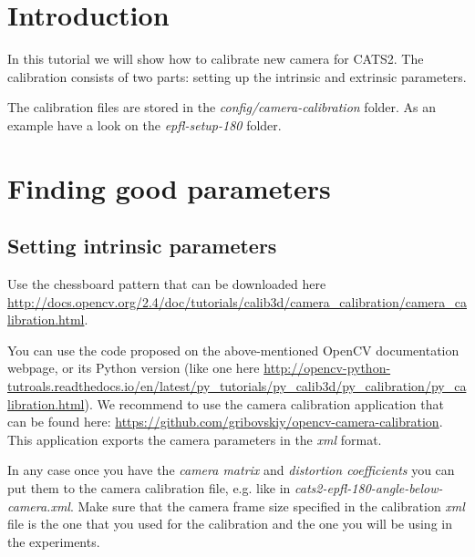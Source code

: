 \documentclass{styles/assisi}
\begin{document}

\lstset{
    language=xml,
    tabsize=3,
    xleftmargin=20pt,
    framexleftmargin=15pt,
    numbers=left,
    numberstyle=\tiny,
    numbersep=5pt,
    breaklines=true,
    showstringspaces=false,
    basicstyle=\footnotesize}

\chapter{Introduction}\label{chap:intro}
In this tutorial we will show how to calibrate new camera for CATS2. The calibration consists of two parts: setting up the intrinsic and extrinsic parameters. 

The calibration files are stored in the {\it config/camera-calibration} folder. As an example have a look on the {\it epfl-setup-180} folder.

\chapter{Finding good parameters}\label{chap:calibration}
\section{Setting intrinsic parameters}
Use the chessboard pattern that can be downloaded here \url{http://docs.opencv.org/2.4/doc/tutorials/calib3d/camera_calibration/camera_calibration.html}. 

You can use the code proposed on the above-mentioned OpenCV documentation webpage, or its Python version (like one here \url{http://opencv-python-tutroals.readthedocs.io/en/latest/py_tutorials/py_calib3d/py_calibration/py_calibration.html}). We recommend to use the camera calibration application that can be found here: \url{https://github.com/gribovskiy/opencv-camera-calibration}. This application exports the camera parameters in the {\it xml} format. 

In any case once you have the {\it camera matrix} and {\it distortion coefficients} you can put them to the camera calibration file, e.g. like in {\it cats2-epfl-180-angle-below-camera.xml}. Make sure that the camera frame size specified in the calibration {\it xml} file is the one that you used for the calibration and the one you will be using in the experiments.
\end{document}
